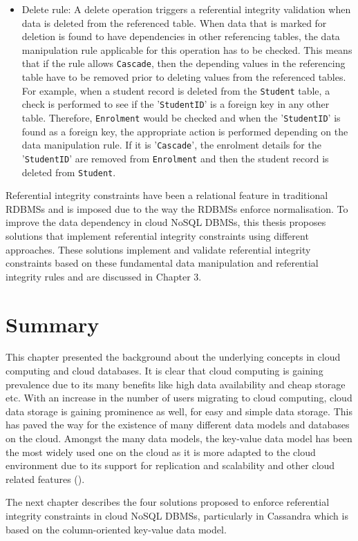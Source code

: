 \begin{itemize}
\item Delete rule: A delete operation triggers a referential integrity
validation when data is deleted from the referenced table.  When data that is marked
for deletion is found to have dependencies in other referencing tables,   the
data manipulation rule applicable for this operation has to be checked.  This
means that if the rule allows \texttt{Cascade},   then the depending values in the
referencing table have to be removed prior to deleting values from the
referenced tables.  For example,   when a student record is deleted from the
\texttt{Student} table,   a check is performed to see if the '\texttt{StudentID}'
is a foreign key in any other table.  Therefore,   \texttt{Enrolment} would be
checked and when the '\texttt{StudentID}' is found as a foreign key,   the
appropriate action is performed depending on the data manipulation rule.  If it
is '\texttt{Cascade}',   the enrolment details for the '\texttt{StudentID}' are
removed from \texttt{Enrolment} and then the student record is deleted from
\texttt{Student}. 

\end{itemize}

Referential integrity constraints have been a relational feature in traditional
\acp{RDBMS} and is imposed due to the way the \acp{RDBMS} enforce normalisation. 
To improve the data dependency in cloud \ac{NoSQL} \acp{DBMS},   this
thesis proposes solutions that implement referential integrity constraints using
different approaches. These solutions implement and
validate referential integrity constraints based on these fundamental data manipulation and
referential integrity rules and are discussed in Chapter 3.




\section{Summary}



This chapter presented the background about the underlying concepts in cloud
computing and cloud databases.  It is clear that cloud computing is gaining
prevalence due to its many benefits like high data availability and cheap
storage etc.  With an increase in the number of users
migrating to cloud computing,   cloud data storage is gaining prominence as well,  
for easy and simple data storage.  This has paved the way for the existence
of many different data models and databases on the cloud.  Amongst the many data
models,   the key-value data model has been the most widely used one on the cloud
as it is more adapted to the cloud environment due to its support for
replication and scalability and other cloud related features (). 



The next chapter describes the four solutions proposed to enforce referential
integrity constraints in cloud \ac{NoSQL} \acp{DBMS},   particularly in
Cassandra which is based on the column-oriented key-value data model. 





